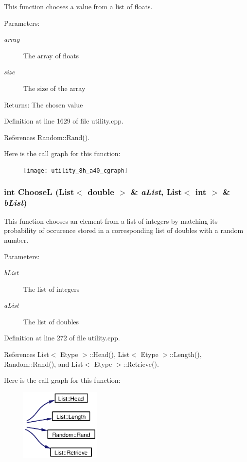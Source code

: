 This function chooses a value from a list of floats. \begin{Desc}
\item[Parameters:]
\begin{description}
\item[{\em array}]The array of floats \item[{\em size}]The size of the array \end{description}
\end{Desc}
\begin{Desc}
\item[Returns:]The chosen value \end{Desc}


Definition at line 1629 of file utility.cpp.

References Random::Rand().

Here is the call graph for this function:\begin{figure}[H]
\begin{center}
\leavevmode
\texttt{[image: utility\_8h\_a40\_cgraph]}
\end{center}
\end{figure}
\subsubsection{\setlength{\rightskip}{0pt plus 5cm}int Choose\-L ({\bf List}$<$ double $>$ \& {\em a\-List}, {\bf List}$<$ int $>$ \& {\em b\-List})}\label{utility_8h_a9}


This function chooses an element from a list of integers by matching its probability of occurence stored in a corresponding list of doubles with a random number. \begin{Desc}
\item[Parameters:]
\begin{description}
\item[{\em b\-List}]The list of integers \item[{\em a\-List}]The list of doubles \end{description}
\end{Desc}


Definition at line 272 of file utility.cpp.

References List$<$ Etype $>$::Head(), List$<$ Etype $>$::Length(), Random::Rand(), and List$<$ Etype $>$::Retrieve().

Here is the call graph for this function:\begin{figure}[H]
\begin{center}
\leavevmode
\includegraphics[width=113pt]{utility_8h_a9_cgraph}
\end{center}
\end{figure}
